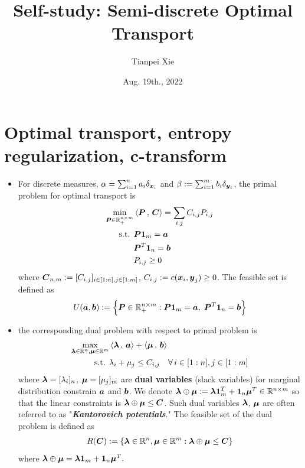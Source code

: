 \documentclass[11pt]{article}
\begin{document}
\title{Self-study: Semi-discrete Optimal Transport}
\author{Tianpei Xie}
\date{ Aug. 19th., 2022 }
\maketitle
\tableofcontents
\newpage
\section{Optimal transport, entropy regularization, c-transform}
\begin{itemize}
\item For discrete measures, $\alpha = \sum_{i=1}^{n}a_i \delta_{\boldsymbol{x}_{i}}$ and $\beta := \sum_{i=1}^{m}b_i \delta_{\boldsymbol{y}_{i}}$, the primal problem for optimal transport is 
\begin{align}
\min_{\boldsymbol{P} \in {\mathbb R}_{+}^{n \times m}} & \left\langle \boldsymbol{P}\,,\, \boldsymbol{C} \right\rangle = \sum_{i,j}C_{i,j} P_{i,j} \label{eqn: optimal_transport_linear_prog}\\
\text{s.t. }&  \boldsymbol{P}\boldsymbol{1}_{m} = \boldsymbol{a} \label{eqn: optimal_transport_linear_constraint}\\
&\boldsymbol{P}^{T}\boldsymbol{1}_{n} = \boldsymbol{b}  \label{eqn: optimal_transport_linear_constraint2} \\
&P_{i,j} \ge 0 \nonumber
\end{align} where $\boldsymbol{C}_{n,m} := [C_{i,j}]_{i\in [1:n], j\in [1:m]}$,  $C_{i,j}:= c(\boldsymbol{x}_i, \boldsymbol{y}_j) \ge 0$. The feasible set is defined as
\begin{align}
U(\boldsymbol{a}, \boldsymbol{b}) := \left\{\boldsymbol{P} \in {\mathbb R}_{+}^{n \times m}: \boldsymbol{P}\boldsymbol{1}_{m} = \boldsymbol{a},\;\boldsymbol{P}^{T}\boldsymbol{1}_{n} = \boldsymbol{b}\right\} \label{eqn: optimal_transport_feasible_set}
\end{align}

\item the corresponding dual problem with respect to primal problem is 
\begin{align}
\max_{\boldsymbol{\lambda} \in {\mathbb R}^{n}, \boldsymbol{\mu} \in {\mathbb R}^{m}} & \left\langle \boldsymbol{\lambda}\,,\, \boldsymbol{a} \right\rangle + \left\langle \boldsymbol{\mu}\,,\, \boldsymbol{b} \right\rangle \label{eqn: optimal_transport_dual}\\
\text{s.t. } & \lambda_i + \mu_{j} \le C_{i,j}\quad \forall\, i\in [1:n], j\in [1:m] \label{eqn: optimal_transport_dual_constraint}
\end{align} where $\boldsymbol{\lambda}= [\lambda_i]_{n}$, $\boldsymbol{\mu}= [\mu_{j}]_{m}$ are \textbf{dual variables} (slack variables) for marginal distribution constrain $\boldsymbol{a}$ and $\boldsymbol{b}$. We denote $\boldsymbol{\lambda}\oplus \boldsymbol{\mu}:= \boldsymbol{\lambda}\boldsymbol{1}_{m}^{T} + \boldsymbol{1}_{n}\boldsymbol{\mu}^{T} \in {\mathbb R}^{n\times m}$ so that the linear constraints is $\boldsymbol{\lambda}\oplus \boldsymbol{\mu} \le \boldsymbol{C}$. Such dual variables $\boldsymbol{\lambda}$, $\boldsymbol{\mu}$ are often referred to as "\emph{\textbf{Kantorovich potentials}}."  The feasible set of the dual problem is defined as 
\begin{align}
R(\boldsymbol{C}) := \left\{\boldsymbol{\lambda} \in {\mathbb R}^{n}, \boldsymbol{\mu} \in {\mathbb R}^{m}: \boldsymbol{\lambda}\oplus \boldsymbol{\mu} \le \boldsymbol{C}\right\} \label{eqn: optimal_transport_dual_feasible_set}
\end{align} where $\boldsymbol{\lambda}\oplus \boldsymbol{\mu} = \boldsymbol{\lambda}\boldsymbol{1}_{m} + \boldsymbol{1}_n \boldsymbol{\mu}^{T}.$


\end{itemize}
\end{document}
